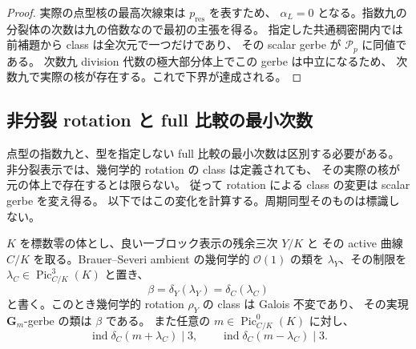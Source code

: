 \begin{proof}
実際の点型核の最高次線束は $p_{\mathrm{res}}$ を表すため、
$\alpha_L=0$ となる。指数九の分裂体の次数は九の倍数なので最初の主張を得る。
指定した共通稠密開内では前補題から class は全次元で一つだけであり、
その scalar gerbe が $\mathscr P_p$ に同値である。
次数九 division 代数の極大部分体上でこの gerbe は中立になるため、
次数九で実際の核が存在する。これで下界が達成される。
\end{proof}

\subsection{非分裂 rotation と full 比較の最小次数}

点型の指数九と、型を指定しない full 比較の最小次数は区別する必要がある。
非分裂表示では、幾何学的 rotation の class は定義されても、
その実際の核が元の体上で存在するとは限らない。
従って rotation による class の変更は scalar gerbe を変え得る。
以下ではこの変化を計算する。周期同型そのものは標識しない。

\begin{lemma}
\label{lem:nfm-unsplit-rotation-gerbe}
$K$ を標数零の体とし、良い一ブロック表示の残余三次 $Y/K$ と
その active 曲線 $C/K$ を取る。Brauer--Severi ambient の幾何学的
$\mathcal O(1)$ の類を $\lambda_Y$、その制限を
$\lambda_C\in\operatorname{Pic}^3_{C/K}(K)$ と置き、
\[
 \beta=\delta_Y(\lambda_Y)=\delta_C(\lambda_C)
\]
と書く。このとき幾何学的 rotation $\rho_Y$ の class は Galois 不変であり、
その実現 $\mathbf G_m$-gerbe の類は $\beta$ である。
また任意の $m\in\operatorname{Pic}^0_{C/K}(K)$ に対し、
\[
 \operatorname{ind}\delta_C(m+\lambda_C)\mid3,
 \qquad
 \operatorname{ind}\delta_C(m-\lambda_C)\mid3.
\]
\end{lemma}

